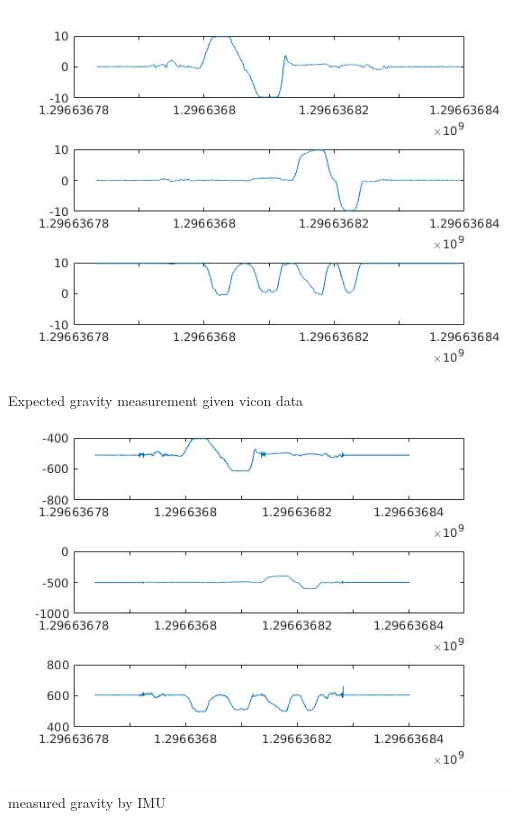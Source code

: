 \documentclass[english]{article}
\begin{document}
\\\\
\includegraphics[scale=0.7]{vicon_g.jpg}\\
Expected gravity measurement given vicon data\\



\includegraphics[scale=0.7]{imu_g.jpg}\\
measured gravity by IMU\\
\end{document}
